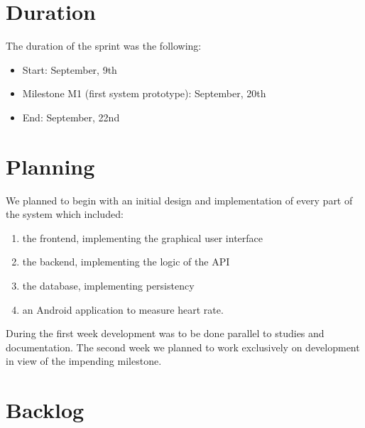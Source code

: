 \newpage
\section{Duration}
The duration of the sprint was the following:
\begin{itemize}
\item Start: September, 9th
\item Milestone M1 (first system prototype): September, 20th
\item End: September, 22nd
\end{itemize}

\section{Planning}

We planned to begin with an initial design and implementation of every part of the system which included:
\begin{enumerate}
\item the frontend, implementing the graphical user interface
\item the backend, implementing the logic of the API
\item the database, implementing persistency
\item an Android application to measure heart rate.
\end{enumerate}
During the first week development was to be done parallel to studies and documentation.
The second week we planned to work exclusively on development in view of the impending milestone.


\section{Backlog}

